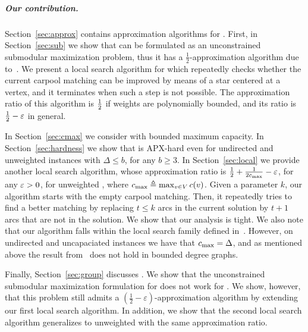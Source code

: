
\subparagraph{Our contribution.}
%
Section~\ref{sec:approx} contains approximation algorithms
for \carpool.  First, in Section~\ref{sec:sub} we show that \carpool
can be formulated as an unconstrained submodular maximization problem,
thus it has a $\frac{1}{2}$-approximation algorithm due
to~\cite{BFNS15,buchbinder2016deterministic}.
%
We present a local search algorithm for \carpool which repeatedly
checks whether the current carpool matching can be improved by means
of a star centered at a vertex, and it terminates when such a step is
not possible.
%
The approximation ratio of this algorithm is $\frac{1}{2}$ if weights are
polynomially bounded, and its ratio is $\frac{1}{2}-\varepsilon$ in general.

In Section~\ref{sec:cmax} we consider \carpool with bounded maximum
capacity.   
%
In Section~\ref{sec:hardness} we show that \carpool is APX-hard even
for undirected and unweighted instances with $\Delta \leq b$, for any
$b \geq 3$.
%
In Section~\ref{sec:local} we provide another local search algorithm,
whose approximation ratio is $\frac{1}{2} + \frac{1}{2c_{\max}} - \varepsilon$, for any
$\varepsilon>0$, for unweighted \carpool, where $c_{\max} \triangleq \max_{v \in V}
c(v)$.  Given a parameter $k$, our algorithm starts with the empty
carpool matching.  Then, it repeatedly tries to find a better matching
by replacing $t \leq k$ arcs in the current solution by $t+1$ arcs
that are not in the solution.
%
We show that our analysis is tight.
%
We also note that our algorithm falls within the local search family
defined in~\cite{ACKK09}.  However, on undirected and uncapaciated
instances we have that $c_{\max} = \Delta$, and as mentioned above the
result from~\cite{ACKK09} does not hold in bounded degree graphs.

Finally, Section~\ref{sec:group} discusses \gcp.  We show that the
unconstrained submodular maximization formulation for \carpool does
not work for \gcp.  We show, however, that this problem still admits a
$(\frac{1}{2} -\varepsilon)$-approximation algorithm by extending our
first local search algorithm.  In addition, we show that the second
local search algorithm generalizes to unweighted \gcp with the same
approximation ratio.
